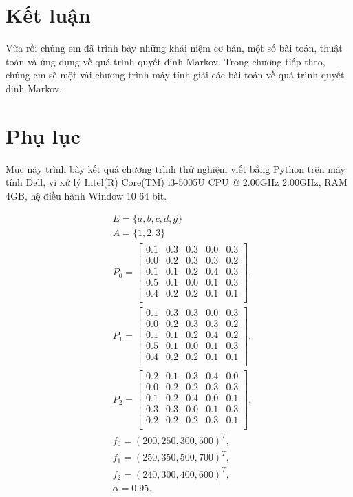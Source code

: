 \documentclass[12pt,a4paper]{report}
\begin{document}
	\chapter{Kết luận}
	\hspace{0.5 cm}
	Vừa rồi chúng em đã trình bày những khái niệm cơ bản, một số bài toán, thuật toán và ứng dụng về quá trình quyết định Markov.
	Trong chương tiếp theo, chúng em sẽ một vài chương trình máy tính giải các bài toán về quá trình quyết định Markov. 
	\chapter{Phụ lục}
	Mục này trình bày kết quả chương trình thử nghiệm viết bằng Python trên máy tính Dell, vi xử lý Intel(R) Core(TM) i3-5005U CPU @ 2.00GHz 2.00GHz, RAM 4GB, hệ điều hành Window 10 64 bit.
	
	\medskip
	\noindent
	\begin{align*}
	&E=\{a,b,c,d,g\}\\
	&A=\{1,2,3\}\\
	&P_0=\left[
	\begin{array}{ccccc}
	0.1&0.3&0.3&0.0&0.3\\
	0.0&0.2&0.3&0.3&0.2\\
	0.1&0.1&0.2&0.4&0.3\\
	0.5&0.1&0.0&0.1&0.3\\
	0.4&0.2&0.2&0.1&0.1\\
	\end{array}
	\right],\\
    &P_1=\left[
	\begin{array}{ccccc}
	0.1&0.3&0.3&0.0&0.3\\
	0.0&0.2&0.3&0.3&0.2\\
	0.1&0.1&0.2&0.4&0.2\\
	0.5&0.1&0.0&0.1&0.3\\
	0.4&0.2&0.2&0.1&0.1\\
	\end{array}
	\right],
	\end{align*}
	\begin{align*}
	 &P_2=\left[
	\begin{array}{ccccc}
		0.2&0.1&0.3&0.4&0.0\\
		0.0&0.2&0.2&0.3&0.3\\
		0.1&0.2&0.4&0.0&0.1\\
		0.3&0.3&0.0&0.1&0.3\\
		0.2&0.2&0.2&0.3&0.1\\
	\end{array}
	\right],\\
	&f_0=(200,250,300,500)^T,\\
	&f_1=(250, 350, 500,700)^T,\\
	&f_2=(240, 300, 400, 600)^T,\\
	& \alpha=0.95.
	\end{align*}
\end{document}
